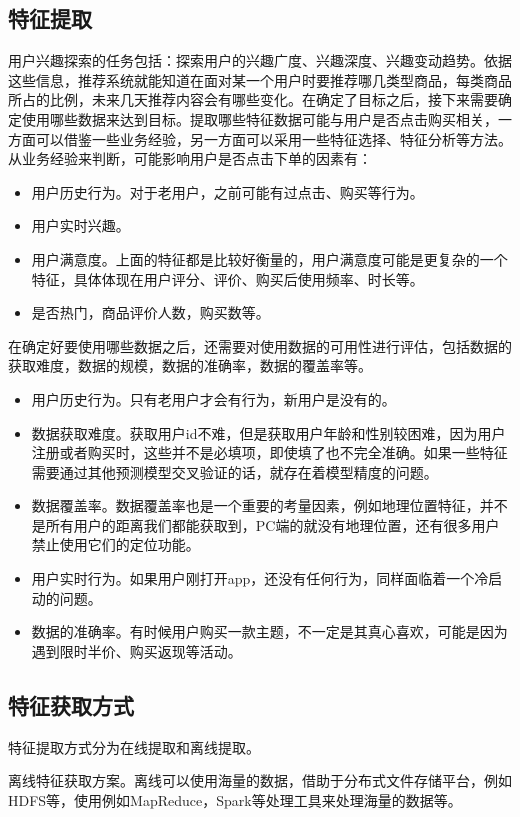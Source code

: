   \subsection{特征提取}
  用户兴趣探索的任务包括：探索用户的兴趣广度、兴趣深度、兴趣变动趋势。依据这些信息，推荐系统就能知道在面对某一个用户时要推荐哪几类型商品，每类商品所占的比例，未来几天推荐内容会有哪些变化。在确定了目标之后，接下来需要确定使用哪些数据来达到目标。提取哪些特征数据可能与用户是否点击购买相关，一方面可以借鉴一些业务经验，另一方面可以采用一些特征选择、特征分析等方法。从业务经验来判断，可能影响用户是否点击下单的因素有：
  \begin{itemize}
  \item 用户历史行为。对于老用户，之前可能有过点击、购买等行为。
  \item 用户实时兴趣。
  \item 用户满意度。上面的特征都是比较好衡量的，用户满意度可能是更复杂的一个特征，具体体现在用户评分、评价、购买后使用频率、时长等。
  \item 是否热门，商品评价人数，购买数等。
  \end{itemize}
  在确定好要使用哪些数据之后，还需要对使用数据的可用性进行评估，包括数据的获取难度，数据的规模，数据的准确率，数据的覆盖率等。
  \begin{itemize}
  \item 用户历史行为。只有老用户才会有行为，新用户是没有的。
  \item 数据获取难度。获取用户id不难，但是获取用户年龄和性别较困难，因为用户注册或者购买时，这些并不是必填项，即使填了也不完全准确。如果一些特征需要通过其他预测模型交叉验证的话，就存在着模型精度的问题。
  \item 数据覆盖率。数据覆盖率也是一个重要的考量因素，例如地理位置特征，并不是所有用户的距离我们都能获取到，PC端的就没有地理位置，还有很多用户禁止使用它们的定位功能。
  \item 用户实时行为。如果用户刚打开app，还没有任何行为，同样面临着一个冷启动的问题。
  \item 数据的准确率。有时候用户购买一款主题，不一定是其真心喜欢，可能是因为遇到限时半价、购买返现等活动。
  \end{itemize}

  \subsection{特征获取方式}
  特征提取方式分为在线提取和离线提取。

  离线特征获取方案。离线可以使用海量的数据，借助于分布式文件存储平台，例如HDFS等，使用例如MapReduce，Spark等处理工具来处理海量的数据等。

